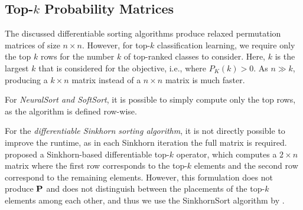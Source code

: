 \documentclass{article}
\newcommand{\revC}[1]{{#1}}
\begin{document}
\subsection{Top-$k$ Probability Matrices}

The discussed differentiable sorting algorithms produce relaxed permutation matrices of size $n\times n$.
However, for top-$k$ classification learning, we require only the top $k$ rows for the number $k$ of top-ranked classes to consider.
\revC{Here, $k$ is the largest $k$ that is considered for the objective, i.e., where $P_K(k)>0$.}
As $n\gg k$, producing a $k\times n$ matrix instead of a $n\times n$ matrix is much faster.


For \textit{NeuralSort and SoftSort}, it is possible to simply compute only the top rows, as the algorithm is defined row-wise. 

For the \textit{differentiable Sinkhorn sorting algorithm}, it is not directly possible to improve the runtime, as in each Sinkhorn iteration the full matrix is required. 
\citet{xie2020differentiable} proposed a Sinkhorn-based differentiable top-$k$ operator, which
computes a $2\times n$ matrix where the first row corresponds to the top-$k$ elements and the second row correspond to the remaining elements. However, this formulation does not produce $\bf{P}$ and does not distinguish between the placements
of the top-$k$ elements among each other, and thus we use the SinkhornSort algorithm by \citet{Cuturi2019-SortingOT}.
\end{document}
